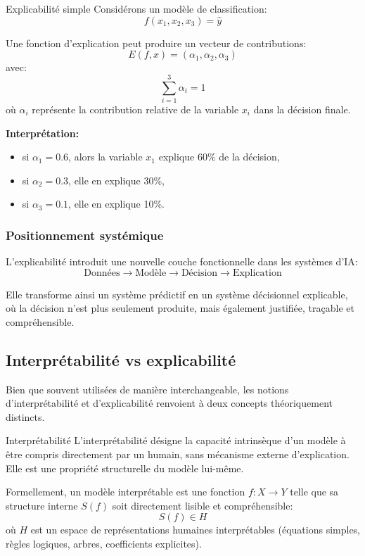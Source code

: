 \begin{exemple}{Explicabilité simple}
Considérons un modèle de classification:
\[
f(x_1, x_2, x_3) = \hat{y}
\]

Une fonction d’explication peut produire un vecteur de contributions:
\[
E(f, x) = (\alpha_1, \alpha_2, \alpha_3)
\]
avec:
\[
\sum_{i=1}^{3} \alpha_i = 1
\]
où $\alpha_i$ représente la contribution relative de la variable $x_i$ dans la décision finale.

\textbf{Interprétation:}
\begin{itemize}
    \item si $\alpha_1 = 0.6$, alors la variable $x_1$ explique 60\% de la décision,
    \item si $\alpha_2 = 0.3$, elle en explique 30\%,
    \item si $\alpha_3 = 0.1$, elle en explique 10\%.
\end{itemize}
\end{exemple}

\subsubsection{Positionnement systémique}

L’explicabilité introduit une nouvelle couche fonctionnelle dans les systèmes d’IA:
\[
\text{Données} \longrightarrow \text{Modèle} \longrightarrow \text{Décision} \longrightarrow \text{Explication}
\]

Elle transforme ainsi un système prédictif en un système décisionnel explicable, où la décision n’est plus seulement produite, mais également justifiée, traçable et compréhensible.

\subsection{Interprétabilité vs explicabilité}

Bien que souvent utilisées de manière interchangeable, les notions d’interprétabilité et d’explicabilité renvoient à deux concepts théoriquement distincts.

\begin{definition}{Interprétabilité}
L’interprétabilité désigne la capacité intrinsèque d’un modèle à être compris directement par un humain, sans mécanisme externe d’explication. Elle est une propriété structurelle du modèle lui-même.

Formellement, un modèle interprétable est une fonction $f: X \rightarrow Y$ telle que sa structure interne $S(f)$ soit directement lisible et compréhensible:
\[
S(f) \in H
\]
où $H$ est un espace de représentations humaines interprétables (équations simples, règles logiques, arbres, coefficients explicites).
\end{definition}

